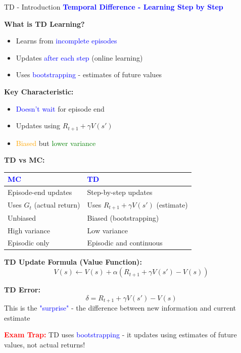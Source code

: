\documentclass[8pt]{beamer}
\begin{document}
	
	\begin{frame}{TD - Introduction}
		\fontsize{6.5}{7.5}\selectfont
		\textcolor{blue}{\textbf{Temporal Difference - Learning Step by Step}}
		
		\textbf{What is TD Learning?}
		\begin{itemize}
			\item Learns from \textcolor{blue}{incomplete episodes}
			\item Updates \textcolor{blue}{after each step} (online learning)
			\item Uses \textcolor{blue}{bootstrapping} - estimates of future values
		\end{itemize}
		
		\textbf{Key Characteristic:}
		\begin{itemize}
			\item \textcolor{blue}{Doesn't wait} for episode end
			\item Updates using $R_{t+1} + \gamma V(s')$
			\item \textcolor{orange}{Biased} but \textcolor{green}{lower variance}
		\end{itemize}
		
		\textbf{TD vs MC:}
		\begin{tabular}{|p{4cm}|p{4cm}|}
			\hline
			\textcolor{blue}{MC} & \textcolor{blue}{TD} \\
			\hline
			Episode-end updates & Step-by-step updates \\
			\hline
			Uses $G_t$ (actual return) & Uses $R_{t+1} + \gamma V(s')$ (estimate) \\
			\hline
			Unbiased & Biased (bootstrapping) \\
			\hline
			High variance & Low variance \\
			\hline
			Episodic only & Episodic and continuous \\
			\hline
		\end{tabular}
		
		\textbf{TD Update Formula (Value Function):}
		\[
		V(s) \leftarrow V(s) + \alpha(R_{t+1} + \gamma V(s') - V(s))
		\]
		
		\textbf{TD Error:}
		\[
		\delta = R_{t+1} + \gamma V(s') - V(s)
		\]
		This is the \textcolor{blue}{"surprise"} - the difference between new information and current estimate
		
		\textcolor{red}{\textbf{Exam Trap:}} TD uses \textcolor{blue}{bootstrapping} - it updates using estimates of future values, not actual returns!
	\end{frame}
	
\end{document}
